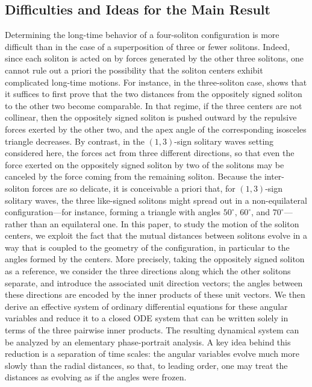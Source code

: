 \documentclass[reqno]{amsart}
\theoremstyle{plain}
\theoremstyle{definition}
\numberwithin{equation}{section}
\newcommand{\1}{\mathbbm{1}}
\begin{document}
\subsection{Difficulties and Ideas for the Main Result}
Determining the long-time behavior of a four-soliton configuration is more difficult than in the case of a superposition of three or fewer solitons. Indeed, since each soliton is acted on by forces generated by the other three solitons, one cannot rule out a priori the possibility that the soliton centers exhibit complicated long-time motions. For instance, in the three-soliton case, \cite{I2} shows that it suffices to first prove that the two distances from the oppositely signed soliton to the other two become comparable. In that regime, if the three centers are not collinear, then the oppositely signed soliton is pushed outward by the repulsive forces exerted by the other two, and the apex angle of the corresponding isosceles triangle decreases. By contrast, in the $(1,3)$-sign solitary waves setting considered here, the forces act from three different directions, so that even the force exerted on the oppositely signed soliton by two of the solitons may be canceled by the force coming from the remaining soliton.
Because the inter-soliton forces are so delicate, it is conceivable a priori that, for $(1,3)$-sign solitary waves, the three like-signed solitons might spread out in a non-equilateral configuration---for instance, forming a triangle with angles $50^\circ$, $60^\circ$, and $70^\circ$---rather than an equilateral one. In this paper, to study the motion of the soliton centers, we exploit the fact that the mutual distances between solitons evolve in a way that is coupled to the geometry of the configuration, in particular to the angles formed by the centers.
More precisely, taking the oppositely signed soliton as a reference, we consider the three directions along which the other solitons separate, and introduce the associated unit direction vectors; the angles between these directions are encoded by the inner products of these unit vectors.
We then derive an effective system of ordinary differential equations for these angular variables and reduce it to a closed ODE system that can be written solely in terms of the three pairwise inner products. The resulting dynamical system can be analyzed by an elementary  phase-portrait analysis.
A key idea behind this reduction is a separation of time scales: the angular variables evolve much more slowly than the radial distances, so that, to leading order, one may treat the distances as evolving as if the angles were frozen.
\end{document}

